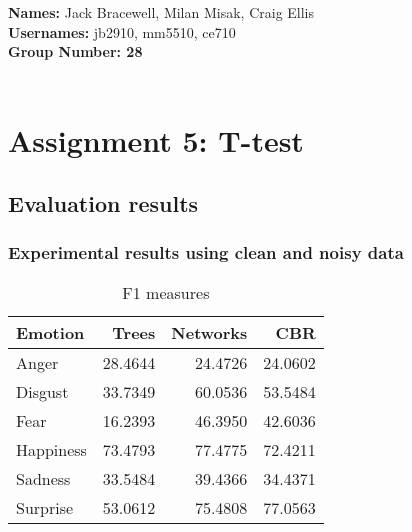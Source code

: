 \documentclass[12pt]{article}
\begin{document}
{\bf Names:} Jack Bracewell, Milan Misak, Craig Ellis \\
{\bf Usernames:} jb2910, mm5510, ce710 \\
{\bf Group Number: 28}  \\ \\

\section*{Assignment 5: T-test}

\subsection*{Evaluation results}

\subsubsection*{Experimental results using clean and noisy data}
\begin{table}
\centering
\begin{tabular}{l | r r r}
Emotion   & Trees   & Networks & CBR     \\
\hline
Anger     & 28.4644 & 24.4726  & 24.0602 \\
Disgust   & 33.7349 & 60.0536  & 53.5484 \\
Fear      & 16.2393 & 46.3950  & 42.6036 \\
Happiness & 73.4793 & 77.4775  & 72.4211 \\
Sadness   & 33.5484 & 39.4366  & 34.4371 \\
Surprise  & 53.0612 & 75.4808  & 77.0563 \\
\end{tabular}
\caption{F1 measures}
\end{table}
\end{document}
